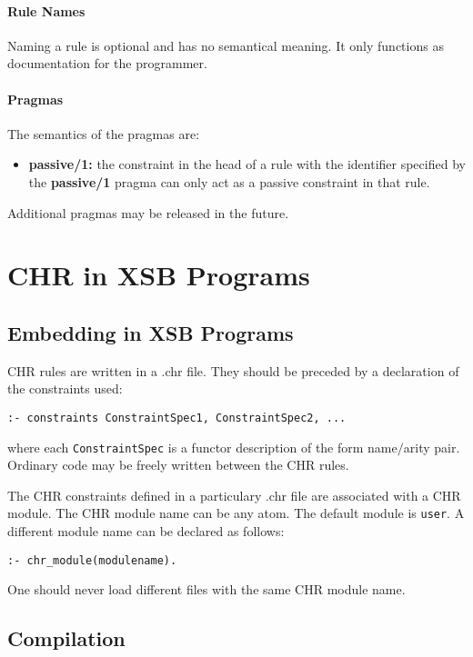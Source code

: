 \paragraph{Rule Names}
Naming a rule is optional and has no semantical meaning. It only functions
as documentation for the programmer.

\paragraph{Pragmas}
The semantics of the pragmas are:
\begin{itemize}
\item \textbf{passive/1:} the constraint in the head of a rule with the identifier specified by
                          the \textbf{passive/1} pragma can only act as a passive constraint in that rule.
\end{itemize}
Additional pragmas may be released in the future.

\section{CHR in XSB Programs} \label{practical}

\subsection{Embedding in XSB Programs}

CHR rules are written in a .chr file. They should be preceded by a declaration of the constraints used:
\begin{verbatim}
:- constraints ConstraintSpec1, ConstraintSpec2, ...
\end{verbatim}
where each \texttt{ConstraintSpec} is a functor description of the form name$\slash$arity pair. Ordinary code
may be freely written between the CHR rules.

The CHR constraints defined in a particulary .chr file are associated
with a CHR module. The CHR module name can be any atom. The default module is
\texttt{user}. A different module name can be declared as follows:
\begin{verbatim}
:- chr_module(modulename).
\end{verbatim}
One should never load different files with the same CHR module name.


\subsection{Compilation}

